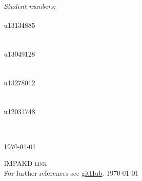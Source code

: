 \documentclass[a4paper,12pt]{article}
\begin{document}
\begin{titlepage}
\begin{center}
\begin{minipage}{0.4\textwidth}
\begin{flushright}
\emph{ \Large Student numbers:} \\[0.4cm]  
\emph{}\\
{\Large u13134885}\\
\emph{}\\
\emph{}\\
{\Large u13049128}\\
\emph{}\\
\emph{}\\
{\Large u13278012}\\
\emph{}\\
\emph{}\\
{\Large u12031748}\\
\emph{}\\
\emph{}\\

\end{flushright}
\end{minipage}


{\large \today}
\end{center}
\end{titlepage}
\renewcommand{\thesection}{\arabic{section}}

\newpage
\begin{center}
\textsc{\Large IMPAKD link}\\[0.5cm]
For further references see \href{https://github.com/u13278012/IMPAKD/}{gitHub}.
\today
\end{center}
\newpage
\tableofcontents{}

\newpage
\end{document}
